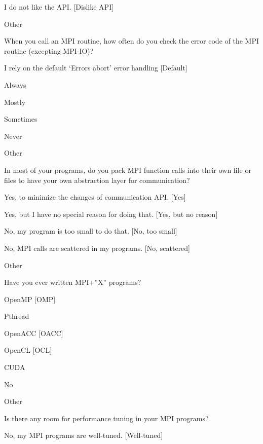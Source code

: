 \documentclass[preprint,5p,times]{elsarticle}
\begin{document}
{{\begin{description}
\begin{inparaenum}[{\bf C}1)]
    \item I do not like the API. [Dislike API]
    \item Other
    \end{inparaenum}
  \item[Q20:] When you call an MPI routine, how often do you check the error code of the MPI routine  (excepting MPI-IO)?
    \begin{inparaenum}[{\bf C}1)]
    \item I rely on the default ‘Errors abort’ error handling [Default]
    \item Always
    \item Mostly
    \item Sometimes
    \item Never
    \item Other
    \end{inparaenum}
  \item[Q21:] In most of your programs, do you pack MPI function calls into their own file or files to have your own abstraction layer for communication?
    \begin{inparaenum}[{\bf C}1)]
    \item Yes, to minimize the changes of communication API. [Yes]
    \item Yes, but I have no special reason for doing that. [Yes, but no reason]
    \item No, my program is too small to do that. [No, too small]
    \item No, MPI calls are scattered in my programs. [No, scattered]
    \item Other
    \end{inparaenum}
  \item[Q22*:] Have you ever written MPI+”X” programs?
    \begin{inparaenum}[{\bf C}1)]
    \item OpenMP [OMP]
    \item Pthread
    \item OpenACC [OACC]
    \item OpenCL [OCL]
    \item CUDA
    \item No
    \item Other
    \end{inparaenum}
  \item[Q23:] Is there any room for performance tuning in your MPI programs?
    \begin{inparaenum}[{\bf C}1)]
    \item No, my MPI programs are well-tuned. [Well-tuned]

\end{inparaenum}
\end{description}}}
\end{document}
